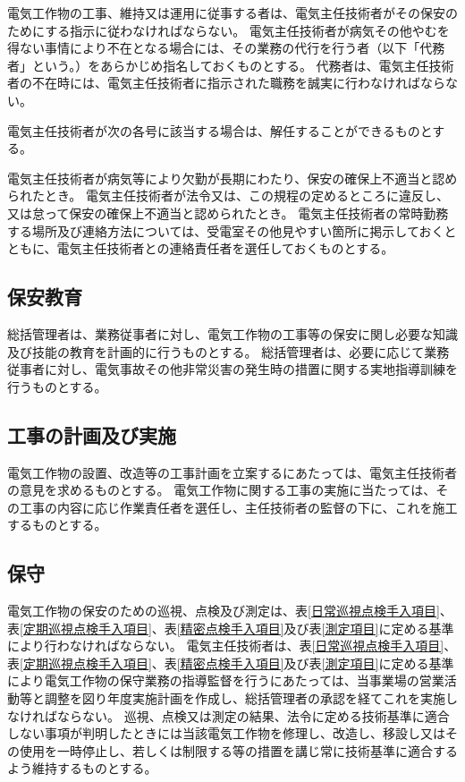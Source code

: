 \documentclass[10pt,a4paper,uplatex]{jsarticle}
\begin{document}
電気工作物の工事、維持又は運用に従事する者は、電気主任技術者がその保安のためにする指示に従わなければならない。
電気主任技術者が病気その他やむを得ない事情により不在となる場合には、その業務の代行を行う者（以下「代務者」という。）をあらかじめ指名しておくものとする。
\term 代務者は、電気主任技術者の不在時には、電気主任技術者に指示された職務を誠実に行わなければならない。

電気主任技術者が次の各号に該当する場合は、解任することができるものとする。
\begin{enumerate}
  \itm 電気主任技術者が病気等により欠勤が長期にわたり、保安の確保上不適当と認められたとき。
  \itm 電気主任技術者が法令又は、この規程の定めるところに違反し、又は怠って保安の確保上不適当と認められたとき。
  \itm 電気主任技術者の常時勤務する場所及び連絡方法については、受電室その他見やすい箇所に掲示しておくとともに、電気主任技術者との連絡責任者を選任しておくものとする。
\end{enumerate}
 
\subsection{保安教育}
総括管理者は、業務従事者に対し、電気工作物の工事等の保安に関し必要な知識及び技能の教育を計画的に行うものとする。
総括管理者は、必要に応じて業務従事者に対し、電気事故その他非常災害の発生時の措置に関する実地指導訓練を行うものとする。

\subsection{工事の計画及び実施}
電気工作物の設置、改造等の工事計画を立案するにあたっては、電気主任技術者の意見を求めるものとする。
電気工作物に関する工事の実施に当たっては、その工事の内容に応じ作業責任者を選任し、主任技術者の監督の下に、これを施工するものとする。

\subsection{保守}
電気工作物の保安のための巡視、点検及び測定は、表\ref{日常巡視点検手入項目}、表\ref{定期巡視点検手入項目}、表\ref{精密点検手入項目}及び表\ref{測定項目}に定める基準により行わなければならない。
\term 電気主任技術者は、表\ref{日常巡視点検手入項目}、表\ref{定期巡視点検手入項目}、表\ref{精密点検手入項目}及び表\ref{測定項目}に定める基準により電気工作物の保守業務の指導監督を行うにあたっては、当事業場の営業活動等と調整を図り年度実施計画を作成し、総括管理者の承認を経てこれを実施しなければならない。
\term 巡視、点検又は測定の結果、法令に定める技術基準に適合しない事項が判明したときには当該電気工作物を修理し、改造し、移設し又はその使用を一時停止し、若しくは制限する等の措置を講じ常に技術基準に適合するよう維持するものとする。
\end{document}
